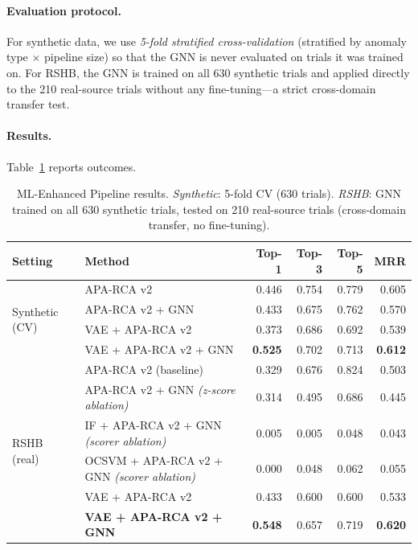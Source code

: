 \documentclass{article}
\newcommand{\aparca}{\textsc{APA-RCA}}
\begin{document}
\paragraph{Evaluation protocol.}
For synthetic data, we use \emph{5-fold stratified cross-validation}
(stratified by anomaly type $\times$ pipeline size) so that the GNN is
never evaluated on trials it was trained on.
For RSHB, the GNN is trained on all 630 synthetic trials and applied directly
to the 210 real-source trials without any fine-tuning---a strict cross-domain
transfer test.

\paragraph{Results.}
Table~\ref{tab:ml} reports outcomes.

\begin{table}[h]
  \centering
  \caption{ML-Enhanced Pipeline results.
           \emph{Synthetic}: 5-fold CV (630 trials).
           \emph{RSHB}: GNN trained on all 630 synthetic trials, tested on 210 real-source
           trials (cross-domain transfer, no fine-tuning).}
  \label{tab:ml}
  \small
  \begin{tabular}{llrrrr}
    \toprule
    Setting & Method & Top-1 & Top-3 & Top-5 & MRR \\
    \midrule
    \multirow{4}{*}{Synthetic (CV)}
      & \aparca{} v2               & 0.446 & 0.754 & 0.779 & 0.605 \\
      & \aparca{} v2 + GNN         & 0.433 & 0.675 & 0.762 & 0.570 \\
      & VAE + \aparca{} v2         & 0.373 & 0.686 & 0.692 & 0.539 \\
      & VAE + \aparca{} v2 + GNN   & \textbf{0.525} & 0.702 & 0.713 & \textbf{0.612} \\
    \midrule
    \multirow{6}{*}{RSHB (real)}
      & \aparca{} v2 (baseline)    & 0.329 & 0.676 & 0.824 & 0.503 \\
      & \aparca{} v2 + GNN \emph{(z-score ablation)} & 0.314 & 0.495 & 0.686 & 0.445 \\
      & IF + \aparca{} v2 + GNN \emph{(scorer ablation)} & 0.005 & 0.005 & 0.048 & 0.043 \\
      & OCSVM + \aparca{} v2 + GNN \emph{(scorer ablation)} & 0.000 & 0.048 & 0.062 & 0.055 \\
      & VAE + \aparca{} v2         & 0.433 & 0.600 & 0.600 & 0.533 \\
      & \textbf{VAE + \aparca{} v2 + GNN} & \textbf{0.548} & 0.657 & 0.719 & \textbf{0.620} \\
    \bottomrule
  \end{tabular}
\end{table}
\end{document}
